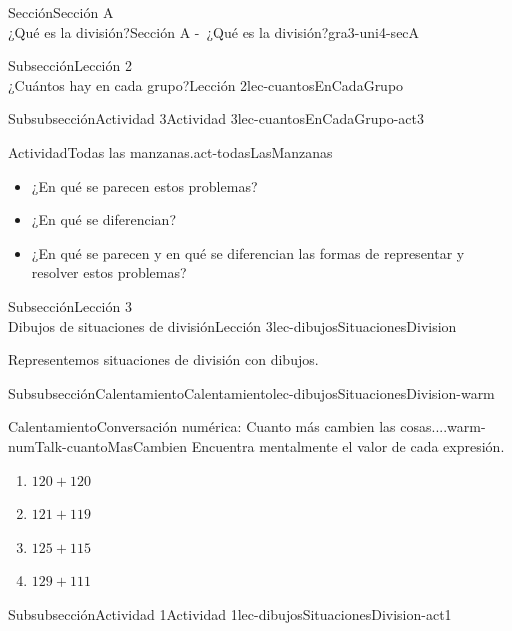 \begin{sectionptx}{Sección}{{\Large Sección A\\}¿Qué es la división?}{}{Sección A -~¿Qué es la división?}{}{}{gra3-uni4-secA}
\begin{subsectionptx}{Subsección}{{\normalsize Lección 2\\[-0.05cm]}¿Cuántos hay en cada grupo?}{}{Lección 2}{}{}{lec-cuantosEnCadaGrupo}
\begin{subsubsectionptx}{Subsubsección}{Actividad 3}{}{Actividad 3}{}{}{lec-cuantosEnCadaGrupo-act3}
\begin{activity}{Actividad}{Todas las manzanas.}{act-todasLasManzanas}
%
\begin{itemize}[label=\textbullet]
\item{}¿En qué se parecen estos problemas?%
\item{}¿En qué se diferencian?%
\item{}¿En qué se parecen y en qué se diferencian las formas de representar y resolver estos problemas?%
\end{itemize}
%
\end{activity}%
\end{subsubsectionptx}
\end{subsectionptx}
%
%
\typeout{************************************************}
\typeout{************************************************}
%
\begin{subsectionptx}{Subsección}{{\normalsize Lección 3\\[-0.05cm]}Dibujos de situaciones de división}{}{Lección 3}{}{}{lec-dibujosSituacionesDivision}
\begin{introduction}{}%
Representemos situaciones de división con dibujos.%
\end{introduction}%
%
%
\typeout{************************************************}
\typeout{************************************************}
%
\begin{subsubsectionptx}{Subsubsección}{Calentamiento}{}{Calentamiento}{}{}{lec-dibujosSituacionesDivision-warm}
\begin{exploration}{Calentamiento}{Conversación numérica: Cuanto más cambien las cosas....}{warm-numTalk-cuantoMasCambien}%
Encuentra mentalmente el valor de cada expresión.%
\par
%
\begin{enumerate}[label={\Alph*.}]
\item{}\(\displaystyle 120 + 120\)%
\item{}\(\displaystyle 121 + 119\)%
\item{}\(\displaystyle 125 + 115\)%
\item{}\(\displaystyle 129 + 111\)%
\end{enumerate}
%
\end{exploration}%
\end{subsubsectionptx}
%
%
\typeout{************************************************}
\typeout{************************************************}
%
\begin{subsubsectionptx}{Subsubsección}{Actividad 1}{}{Actividad 1}{}{}{lec-dibujosSituacionesDivision-act1}

\end{subsubsectionptx}
\end{subsectionptx}
\end{sectionptx}
